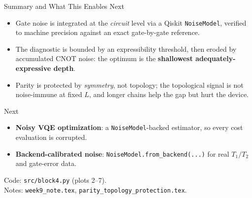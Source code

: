 \documentclass[aspectratio=169,12pt]{beamer}
\begin{document}
\begin{frame}{Summary and What This Enables Next}
  \small
  \begin{itemize}
    \item Gate noise is integrated at the \emph{circuit} level via a Qiskit \texttt{NoiseModel}, verified to machine precision against an exact gate-by-gate reference.
    \item The diagnostic is bounded by an expressibility threshold, then eroded by accumulated CNOT noise: the optimum is the \textbf{shallowest adequately-expressive depth}.
    \item Parity is protected by \emph{symmetry}, not topology; the topological signal is not noise-immune at fixed $L$, and longer chains help the gap but hurt the device.
  \end{itemize}
  \begin{block}{Next}
    \begin{itemize}
      \item \textbf{Noisy VQE optimization}: a \texttt{NoiseModel}-backed estimator, so every cost evaluation is corrupted.
      \item \textbf{Backend-calibrated noise}: \texttt{NoiseModel.from\_backend(...)} for real $T_1/T_2$ and gate-error data.
    \end{itemize}
  \end{block}
  \centering
  \scriptsize Code: \texttt{src/block4.py} (plots 2--7).\\
  Notes: \texttt{week9\_note.tex}, \texttt{parity\_topology\_protection.tex}.
\end{frame}
\end{document}
